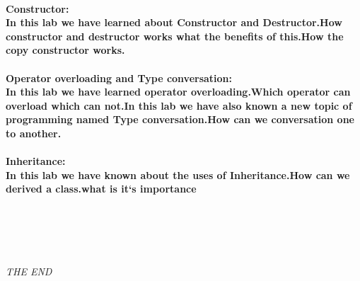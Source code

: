 \documentclass[12pt]{article}
\begin{document}
  \paragraph{Constructor:\\
   In this lab we have learned about Constructor and Destructor.How constructor and destructor works what the benefits of this.How the copy constructor works.}
    \paragraph{Operator overloading and Type conversation:\\
    In this lab we have learned operator overloading.Which operator can overload which can not.In this lab we have also known a new topic of programming named Type conversation.How can we conversation one to another.}
    \paragraph{Inheritance:\\
    In this lab we have known about the uses of Inheritance.How can we derived a class.what is it`s importance}
    \bigskip \bigskip
  \textsl{\\ \\ \\ \\ \center THE END \\}
 
\end{document}
